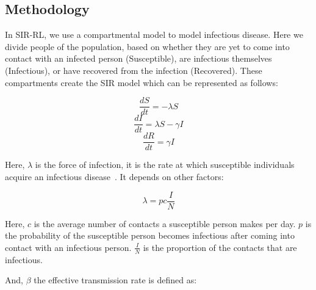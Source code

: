 \documentclass[tikz,fleqn,12pt]{wlscirep}
\begin{document}
\subsection*{Methodology}
In SIR-RL, we use a compartmental model to model infectious disease. Here we divide people of the population, based on whether they are yet to come into contact with an infected person (Susceptible), are infectious themselves (Infectious), or have recovered from the infection (Recovered). These compartments create the SIR model which can be represented as follows:

\begin{figure}[H]
\centering    
{}
\end{figure}
\begin{equation}
  \frac{d S}{d t}=-\lambda S
  \label{eq:S_without_lockdown}
\end{equation}
\begin{equation}
  \frac{d I}{d t}=\lambda S-\gamma I
  \label{eq:I_without_lockdown}
\end{equation}
\begin{equation}
  \frac{d R}{d t}=\gamma I
  \label{eq:R_without_lockdown}
\end{equation}

Here, $\lambda$ is the force of infection, it is the rate at which susceptible individuals acquire an infectious disease~\cite{hens_aerts_faes_shkedy_lejeune_vandamme_beutels_2010}. It depends on other factors:

\begin{equation}
  \lambda = pc\frac{I}{N}
  \label{eq:lambda_force_of_infection}
\end{equation}

Here, 
$c$ is the average number of contacts a susceptible person makes per day.
$p$ is the probability of the susceptible person becomes infectious after coming into contact with an infectious person.
$\frac{I}{N}$ is the proportion of the contacts that are infectious.

And, $\beta$ the effective transmission rate is defined as:
\end{document}
